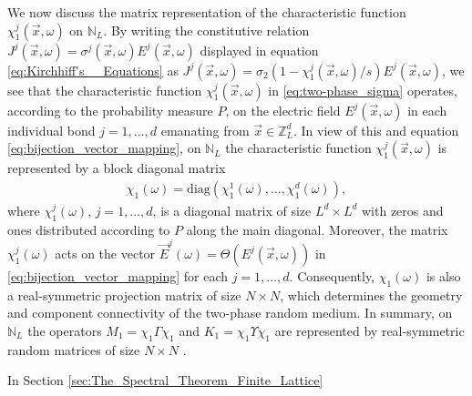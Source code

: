 \documentclass{cmslatex}
\begin{document}
We now discuss the matrix representation of the characteristic
function $\chi_1^j(\vec{x},\omega)$ on $\mathbb{N}_L$. By writing the
constitutive relation $J^j(\vec{x},\omega)=\sigma^j(\vec{x},\omega)E^j(\vec{x},\omega)$
displayed in equation \eqref{eq:Kirchhiff's__Equations} as
$J^j(\vec{x},\omega)=\sigma_2(1-\chi_1^j(\vec{x},\omega)/s)E^j(\vec{x},\omega)$, 
we see that the characteristic
function $\chi_1^j(\vec{x},\omega)$ in \eqref{eq:two-phase_sigma} operates,
according to the probability measure $P$, on the electric field
$E^j(\vec{x},\omega)$ in each individual bond $j=1,\ldots,d$ emanating from
$\vec{x}\in\mathbb{Z}_L^d$. In view of this and equation
\eqref{eq:bijection_vector_mapping}, on
$\mathbb{N}_L$ the characteristic function $\chi_1^j(\vec{x},\omega)$ is
represented by a block diagonal matrix 
%
\begin{align}\label{eq:block_diag_chi}  
  \chi_1(\omega)=\text{diag}(\chi_1^1(\omega),\ldots,\chi_1^d(\omega)),
\end{align}
%
where $\chi_1^j(\omega)$, $j=1,\ldots,d$, is a diagonal matrix of size $L^d\times L^d$ with
zeros and ones distributed according to $P$ along the main
diagonal. Moreover, the matrix $\chi_1^j(\omega)$ acts on the vector
$\vec{E}^j(\omega)=\Theta(E^j(\vec{x},\omega))$ in
\eqref{eq:bijection_vector_mapping} for each $j=1,\ldots,d$. Consequently, 
$\chi_1(\omega)$ is also a real-symmetric projection matrix of size $N\times N$,
which determines the geometry and component connectivity of the
two-phase random medium. In summary, on $\mathbb{N}_L$ the operators
$M_1=\chi_1\Gamma\chi_1$ and $K_1=\chi_1\Upsilon\chi_1$ are represented by real-symmetric
random matrices of size $N\times N$
\cite{Golden:J_Biomech:337,Murphy:JMP:063506}. 


In Section \ref{sec:The_Spectral_Theorem_Finite_Lattice}
\end{document}

